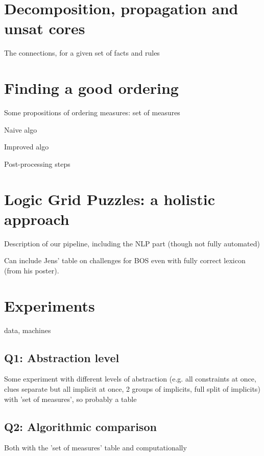 \documentclass{ecai}
\begin{document}

\section{Decomposition, propagation and unsat cores}
The connections, for a given set of facts and rules

\section{Finding a good ordering}
Some propositions of ordering measures: set of measures

Naive algo

Improved algo

Post-processing steps

\section{Logic Grid Puzzles: a holistic approach}\label{sec:holistic}
Description of our pipeline, including the NLP part (though not fully automated)

Can include Jens' table on challenges for BOS even with fully correct lexicon (from his poster).

\section{Experiments}

data, machines

\subsection{Q1: Abstraction level}
Some experiment with different levels of abstraction (e.g. all constraints at once, clues separate but all implicit at once, 2 groups of implicits, full split of implicits)
with 'set of measures', so probably a table

\subsection{Q2: Algorithmic comparison}
Both with the 'set of measures' table and computationally
\end{document}
